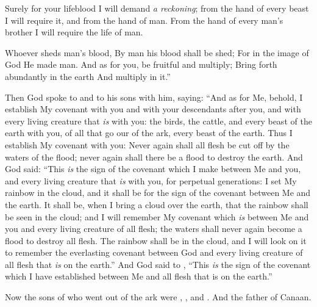 \bverse Surely for your lifeblood I will demand \textit{a reckoning}; from the hand of every beast I will require it, and from the hand of man. From the hand of every man's brother I will require the life of man.
\begin{bquotation}
\bverse Whoever sheds man's blood, By man his blood shall be shed; For in the image of God He made man. 
\bverse And as for you, be fruitful and multiply; Bring forth abundantly in the earth And multiply in it.''
\end{bquotation}
\bverse Then God spoke to  and to his sons with him, saying:
\bverse ``And as for Me, behold, I establish My covenant with you and with your descendants after you,
\bverse and with every living creature that \textit{is} with you: the birds, the cattle, and every beast of the earth with you, of all that go our of the ark, every beast of the earth.
\bverse Thus I establish My covenant with you: Never again shall all flesh be cut off by the waters of the flood; never again shall there be a flood to destroy the earth.
\bverse And God said: ``This \textit{is} the sign of the covenant which I make between Me and you, and every living creature that \textit{is} with you, for perpetual generations:
\bverse I set My rainbow in the cloud, and it shall be for the sign of the covenant between Me and the earth.
\bverse It shall be, when I bring a cloud over the earth, that the rainbow shall be seen in the cloud;
\bverse and I will remember My covenant which \textit{is} between Me and you and every living creature of all flesh; the waters shall never again become a flood to destroy all flesh.
\bverse The rainbow shall be in the cloud, and I will look on it to remember the everlasting covenant between God and every living creature of all flesh that \textit{is} on the earth.''
\bverse And God said to , ``This \textit{is} the sign of the covenant which I have established between Me and all flesh that is on the earth.''


\bverse Now the sons of  who went out of the ark were , , and . And  \was the father of Canaan.

